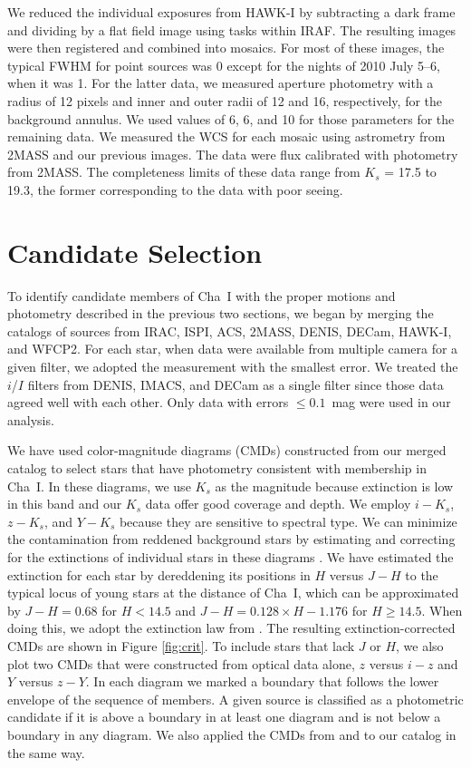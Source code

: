 \documentclass{emulateapj}
\begin{document}
We reduced the individual exposures from HAWK-I by subtracting a dark 
frame and dividing by a flat field image using tasks within IRAF. 
The resulting images were then registered and combined into mosaics.
For most of these images,
the typical FWHM for point sources was 0
except for the nights of 2010 July 5--6, when it was 1.
For the latter data, 
we measured aperture photometry with a radius of 12 pixels 
and inner and outer radii of 12 and 16, respectively, for the background annulus.
We used values of 6, 6, and 10 for those parameters for the remaining data. 
We measured the WCS for each mosaic using astrometry from 2MASS and our previous images.
The data were flux calibrated with photometry from 2MASS. 
The completeness limits of these data range from $K_s$ = 17.5 to 19.3,
the former corresponding to the data with poor seeing. 

\section{Candidate Selection}\label{sec:selection}

To identify candidate members of Cha~I with the proper motions and photometry described
in the previous two sections, we began by merging the catalogs of sources from IRAC,
ISPI, ACS, 2MASS, DENIS, DECam, HAWK-I, and WFCP2. For each star, when data were available
from multiple camera for a given filter, we adopted the measurement with the smallest error.
We treated the $i$/$I$ filters from DENIS, IMACS, and DECam as a single filter since those data
agreed well with each other. Only data with errors $\leq0.1$~mag were used in our analysis.

We have used color-magnitude diagrams (CMDs) constructed from our merged catalog 
to select stars that have photometry consistent with membership in Cha~I.
In these diagrams, 
we use $K_s$ as the magnitude because extinction is low in this band and our $K_s$ data offer
good coverage and depth. 
We employ $i - K_s$, $z - K_s$, and $Y - K_s$ because they are sensitive to spectral type.
We can minimize the contamination from reddened background stars 
by estimating and correcting for the extinctions of individual stars in these diagrams \citep{luh03}.
We have estimated the extinction for each star by dereddening its 
positions in $H$ versus $J-H$ to the typical locus 
of young stars at the distance of Cha~I,
which can be approximated by $J-H = 0.68$ for $H < 14.5$ and 
$J-H = 0.128 \times H - 1.176$ for $H \geq 14.5$.
When doing this, we adopt the extinction law from \cite{car89}. 
The resulting extinction-corrected CMDs are shown in Figure \ref{fig:crit}.
To include stars that lack $J$ or $H$, 
we also plot two CMDs that were constructed from optical data alone,
$z$ versus $i - z$ and $Y$ versus $z - Y$.
In each diagram we marked a boundary that follows the lower envelope of the sequence of members. 
A given source is classified as a photometric candidate if it is above a boundary in at least one diagram 
and is not below a boundary in any diagram. 
We also applied the CMDs from \cite{luhm07} and \cite{tod14} to our catalog in the same way.
\end{document}
